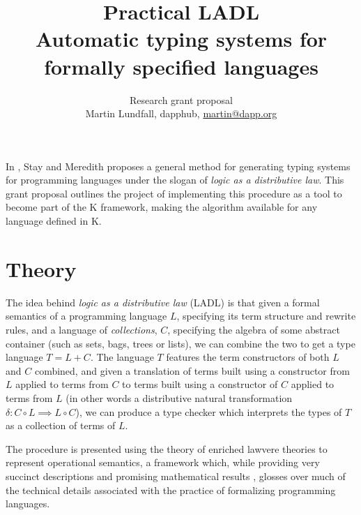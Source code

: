 


\title{Practical LADL \\
  \large {Automatic typing systems for formally specified languages}}
\author{Research grant proposal \\
  Martin Lundfall, dapphub, \href{mailto:martin@dapp.org}{martin@dapp.org} 
}
\maketitle
\abstract
In \cite{stay2016logic}, Stay and Meredith proposes a general method for generating typing systems for programming languages under the slogan of \textit{logic as a distributive law}. This grant proposal outlines the project of implementing this procedure as a tool to become part of the K framework, making the algorithm available for any language defined in K.

\section{Theory}
The idea behind \textit{logic as a distributive law} (LADL) is that given a formal semantics of a programming language $L$, specifying its term structure and rewrite rules, and a language of \textit{collections}, $C$, specifying the algebra of some abstract container (such as sets, bags, trees or lists), we can combine the two to get a type language $T = L + C$. The language $T$ features the term constructors of both $L$ and $C$ combined, and given a translation of terms built using a constructor from $L$ applied to terms from $C$ to terms built using a constructor of $C$ applied to terms from $L$ (in other words a distributive natural transformation $\delta : C \circ L \implies L \circ C$), we can produce a type checker which interprets the types of $T$ as a collection of terms of $L$.

The procedure is presented using the theory of enriched lawvere theories to represent operational semantics, a framework which, while providing very succinct descriptions and promising mathematical results \cite{Williams}, glosses over much of the technical details associated with the practice of formalizing programming languages. 

